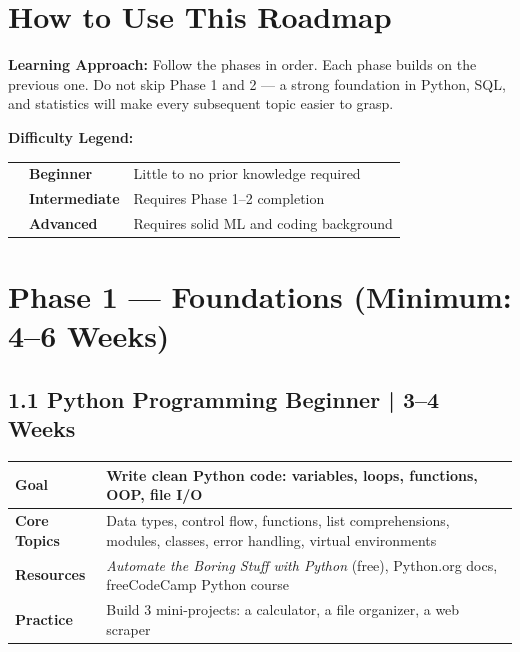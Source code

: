 \documentclass[a4paper,11pt]{article}
\begin{document}
\section{How to Use This Roadmap}

\begin{infobox}
\textbf{Learning Approach:} Follow the phases in order. Each phase builds on the previous one. Do not skip Phase 1 and 2 — a strong foundation in Python, SQL, and statistics will make every subsequent topic easier to grasp.
\end{infobox}

\vspace{0.4cm}
\noindent\textbf{Difficulty Legend:}

\begin{tabular}{lll}
  \cellcolor{beginner}\quad\quad & \textbf{Beginner} & Little to no prior knowledge required \\[4pt]
  \cellcolor{intermediate}\quad\quad & \textbf{Intermediate} & Requires Phase 1--2 completion \\[4pt]
  \cellcolor{advanced}\quad\quad & \textbf{Advanced} & Requires solid ML and coding background \\
\end{tabular}

\section{Phase 1 — Foundations \hfill \small\normalfont\color{teal}(Minimum: 4--6 Weeks)}

\subsection{1.1 Python Programming \hfill \small\normalfont\color{darkgray}Beginner | 3--4 Weeks}

\begin{tabular}{>{\bfseries}p{3cm} p{11.5cm}}
\toprule
Goal & Write clean Python code: variables, loops, functions, OOP, file I/O \\
\midrule
Core Topics & Data types, control flow, functions, list comprehensions, modules, classes, error handling, virtual environments \\
Resources & \textit{Automate the Boring Stuff with Python} (free), Python.org docs, freeCodeCamp Python course \\
Practice & Build 3 mini-projects: a calculator, a file organizer, a web scraper \\
\bottomrule
\end{tabular}
\end{document}
